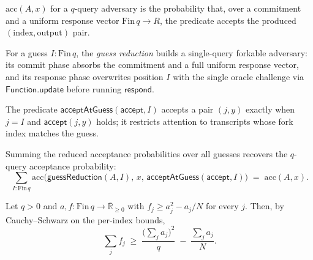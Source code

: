\begin{definition}
  \label{def:qaccept-prob}
  \leanok
  $\mathrm{acc}(A,x)$ for a $q$-query adversary is the probability that, over a
  commitment and a uniform response vector $\mathrm{Fin}\,q \to R$, the predicate
  accepts the produced $(\text{index}, \text{output})$ pair.
\end{definition}

\begin{definition}
  \label{def:guess-reduction}
  \leanok
  For a guess $I : \mathrm{Fin}\,q$, the \emph{guess reduction} builds a
  single-query forkable adversary: its commit phase absorbs the commitment and a
  full uniform response vector, and its response phase overwrites position $I$
  with the single oracle challenge via $\mathsf{Function.update}$ before running
  $\mathsf{respond}$.
\end{definition}

\begin{definition}
  \label{def:accept-at-guess}
  \leanok
  The predicate $\mathsf{acceptAtGuess}(\mathsf{accept}, I)$ accepts a pair
  $(j, y)$ exactly when $j = I$ and $\mathsf{accept}(j,y)$ holds; it restricts
  attention to transcripts whose fork index matches the guess.
\end{definition}

\begin{lemma}
  \label{lem:sum-accept-at-guess}
  \leanok
  Summing the reduced acceptance probabilities over all guesses recovers the
  $q$-query acceptance probability:
  \[
    \sum_{I : \mathrm{Fin}\,q}
      \mathrm{acc}\big(\mathsf{guessReduction}(A,I),\, x,\, \mathsf{acceptAtGuess}(\mathsf{accept},I)\big)
    \;=\; \mathrm{acc}(A,x).
  \]
\end{lemma}

\begin{theorem}
  \label{thm:bellare-neven-agg}
  \leanok
  Let $q > 0$ and $a, f : \mathrm{Fin}\,q \to \overline{\mathbb{R}}_{\geq 0}$ with
  $f_j \geq a_j^2 - a_j / N$ for every $j$. Then, by Cauchy--Schwarz on the
  per-index bounds,
  \[
    \sum_{j} f_j \;\geq\;
    \frac{\big(\sum_j a_j\big)^2}{q} \;-\; \frac{\sum_j a_j}{N}.
  \]
\end{theorem}

